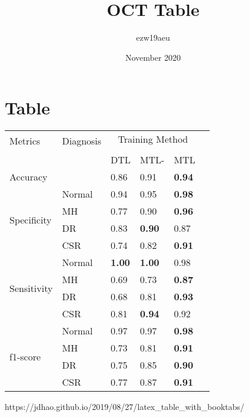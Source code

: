 \documentclass{article}
\title{OCT Table}
\author{ezw19aeu }
\date{November 2020}
\begin{document}

\section{Table}

\begin{table}[h]
    \centering
    \begin{tabular}{llllll}
        \toprule
        \multirow{2}{*}{Metrics} & \multirow{2}{*}{Diagnosis} & \multicolumn{3}{c}{Training Method}\\
        \cmidrule{3-5} \\
        {} & {} & DTL & MTL- & MTL \\
        \midrule
        Accuracy & {} & 0.86 & 0.91 & \textbf{0.94} \\
        \midrule
        \multirow{4}{*}{Specificity} & Normal & 0.94 & 0.95 & \textbf{0.98} \\
        {} & MH & 0.77 & 0.90 & \textbf{0.96} \\
        {} & DR & 0.83 & \textbf{0.90} & 0.87 \\
        {} & CSR & 0.74 & 0.82 & \textbf{0.91} \\
        \midrule
        \multirow{4}{*}{Sensitivity} & Normal & \textbf{1.00} & \textbf{1.00} & 0.98 \\
        {} & MH & 0.69 & 0.73 & \textbf{0.87} \\
        {} & DR & 0.68 & 0.81 & \textbf{0.93} \\
        {} & CSR & 0.81 & \textbf{0.94} & 0.92 \\
        \midrule
        \multirow{4}{*}{f1-score} & Normal & 0.97 & 0.97 & \textbf{0.98} \\
        {} & MH & 0.73 & 0.81 & \textbf{0.91} \\
        {} & DR & 0.75 & 0.85 & \textbf{0.90} \\
        {} & CSR & 0.77 & 0.87 & \textbf{0.91} \\
        
    
    \end{tabular}
    
\end{table}

https://jdhao.github.io/2019/08/27/latex_table_with_booktabs/
\end{document}
